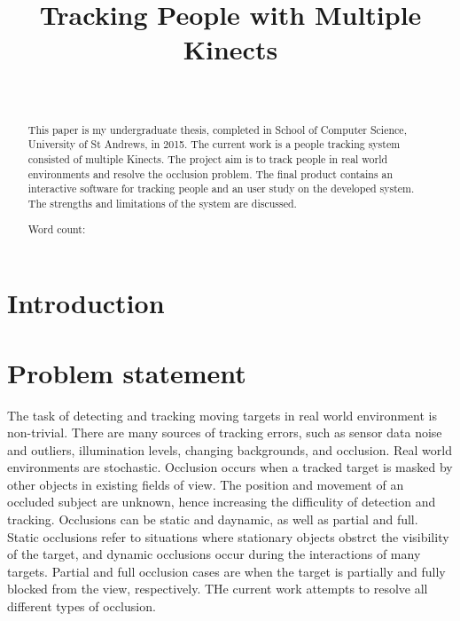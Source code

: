 \documentclass{sigchi}
\begin{document}
\title{Tracking People with Multiple Kinects}

\author{%
  \\
}

\maketitle

\begin{abstract}
This paper is my undergraduate thesis, completed in School of Computer Science, University of St Andrews, in 2015. The current work is a people tracking system consisted of multiple Kinects. The project aim is to track people in real world environments and resolve the occlusion problem. The final product contains an interactive software for tracking people and an user study on the developed system. The strengths and limitations of the system are discussed.

Word count: 
\end{abstract}



\section{Introduction}



\section{Problem statement}

The task of detecting and tracking moving targets in real world environment is non-trivial. There are many sources of tracking errors, such as sensor data noise and outliers, illumination levels, changing backgrounds, and occlusion. Real world environments are stochastic. Occlusion occurs when a tracked target is masked by other objects in existing fields of view. The position and movement of an occluded subject are unknown, hence increasing the difficulity of detection and tracking. Occlusions can be static and daynamic, as well as partial and full. Static occlusions refer to situations where stationary objects obstrct the visibility of the target, and dynamic occlusions occur during the interactions of many targets. Partial and full occlusion cases are when the target is partially and fully blocked from the view, respectively. THe current work attempts to resolve all different types of occlusion.
\end{document}

